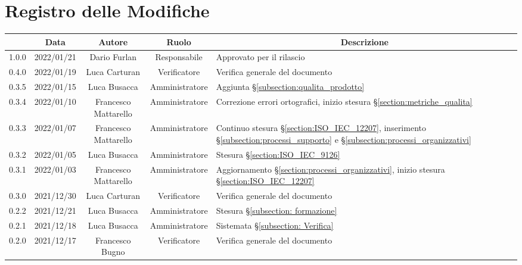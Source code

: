 \thispagestyle{empty}
\section*{Registro delle Modifiche}

\begin{center}
	\renewcommand{\arraystretch}{1.8}
	\begin{longtable}[c]{c | c | c | c | p{5cm}}
		\rowcolor[HTML]{125E28}
		\multicolumn{1}{c}{\color[HTML]{FFFFFF} \textbf{Versione}} &
		\multicolumn{1}{c}{\color[HTML]{FFFFFF} \textbf{Data}}     &
		\multicolumn{1}{c}{\color[HTML]{FFFFFF} \textbf{Autore}}   &
		\multicolumn{1}{c}{\color[HTML]{FFFFFF} \textbf{Ruolo}}    &
		\multicolumn{1}{c}{\color[HTML]{FFFFFF} \textbf{Descrizione}} \\
		\endhead
		1.0.0 & 2022/01/21 & Dario Furlan & Responsabile & Approvato per il rilascio \\
		0.4.0 & 2022/01/19 & Luca Carturan & Verificatore & Verifica generale del documento \\
		0.3.5 & 2022/01/15 & Luca Busacca & Amministratore & Aggiunta §\ref{subsection:qualita_prodotto} \\
		0.3.4 & 2022/01/10 & Francesco Mattarello & Amministratore & Correzione errori ortografici, inizio stesura §\ref{section:metriche_qualita} \\
		0.3.3 & 2022/01/07 & Francesco Mattarello & Amministratore & Continuo stesura §\ref{section:ISO_IEC_12207}, inserimento §\ref{subsection:processi_supporto} e §\ref{subsection:processi_organizzativi} \\
		0.3.2 & 2022/01/05 & Luca Busacca         & Amministratore & Stesura §\ref{section:ISO_IEC_9126} \\
		0.3.1 & 2022/01/03 & Francesco Mattarello & Amministratore & Aggiornamento §\ref{section:processi_organizzativi}, inizio stesura §\ref{section:ISO_IEC_12207} \\
		0.3.0 & 2021/12/30 & Luca Carturan        & Verificatore   & Verifica generale del documento \\
		0.2.2 & 2021/12/21 & Luca Busacca         & Amministratore & Stesura §\ref{subsection: formazione} \\
		0.2.1 & 2021/12/18 & Luca Busacca         & Amministratore & Sistemata §\ref{subsection: Verifica} \\
		0.2.0 & 2021/12/17 & Francesco Bugno      & Verificatore   & Verifica generale del documento \\

\end{longtable}
\end{center}
